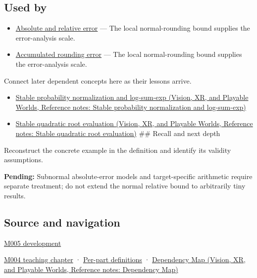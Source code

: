 \subsection{Used by}\label{appendix-bc44f7b42f42-used-by}

\hypertarget{appendix-bc44f7b42f42-used-by}{}

\begin{itemize}
\tightlist
\item
  \hyperref[appendix-3ae74e89b4e6]{Absolute and relative error} --- The local normal-rounding bound supplies the error-analysis scale.
\item
  \hyperref[appendix-f82e270791c8]{Accumulated rounding error} --- The local normal-rounding bound supplies the error-analysis scale.
\end{itemize}

Connect later dependent concepts here as their lessons arrive.

\begin{itemize}
\tightlist
\item
  \href{../07-Vision-XR-and-Playable-Worlds/main.pdf\#nameddest=appendix-d580b422240f}{Stable probability normalization and log-sum-exp (Vision, XR, and Playable Worlds, Reference notes: Stable probability normalization and log-sum-exp)}
\item
  \href{../07-Vision-XR-and-Playable-Worlds/main.pdf\#nameddest=appendix-b9afba7f63e5}{Stable quadratic root evaluation (Vision, XR, and Playable Worlds, Reference notes: Stable quadratic root evaluation)} \#\# Recall and next depth
\end{itemize}

Reconstruct the concrete example in the definition and identify its validity assumptions.

\textbf{Pending:} Subnormal absolute-error models and target-specific arithmetic require separate treatment; do not extend the normal relative bound to arbitrarily tiny results.

\subsection{Source and navigation}\label{appendix-bc44f7b42f42-source-and-navigation}

\hypertarget{appendix-bc44f7b42f42-source-and-navigation}{}

\hyperref[01-foundations-i-ch001-when-arithmetic-meets-uncertainty]{M005 development}

\hyperref[01-foundations-i-ch001-a-stretching-ruler-for-real-valued-quantities]{M004 teaching chapter} · \hyperref[appendix-fd090d982a15-m004---parts-61-76]{Per-part definitions} · \href{../07-Vision-XR-and-Playable-Worlds/main.pdf\#nameddest=appendix-4ad47bdd269a}{Dependency Map (Vision, XR, and Playable Worlds, Reference notes: Dependency Map)}
